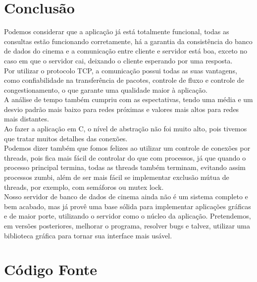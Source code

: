 \documentclass[11pt,twoside]{article}
\begin{document}
\section{Conclusão}
Podemos considerar que a aplicação já está totalmente funcional, todas as consultas estão funcionando corretamente, há a garantia da consistência do banco de dados do cinema e a comunicação entre cliente e servidor está boa, exceto no caso em que o servidor cai, deixando o cliente esperando por uma resposta.\\
Por utilizar o protocolo TCP, a comunicação possui todas as suas vantagens, como confiabilidade na transferência de pacotes, controle de fluxo e controle de congestionamento, o que garante uma qualidade maior à aplicação.\\
A análise de tempo também cumpriu com as espectativas, tendo uma média e um desvio padrão mais baixo para redes próximas e valores mais altos para redes mais distantes.\\
Ao fazer a aplicação em C, o nível de abstração não foi muito alto, pois tivemos que tratar muitos detalhes das conexões.\\
Podemos dizer também que fomos felizes ao utilizar um controle de conexões por threads, pois fica mais fácil de controlar do que com processos, já que quando o processo principal termina, todas as threads também terminam, evitando assim processos zumbi, além de ser mais fácil se implementar exclusão mútua de threads, por exemplo, com semáforos ou mutex lock.\\
Nosso servidor de banco de dados de cinema ainda não é um sistema completo e bem acabado, mas já provê uma base sólida para implementar aplicações gráficas e de maior porte, utilizando o servidor como o núcleo da aplicação. Pretendemos, em versões posteriores, melhorar o programa, resolver bugs e talvez, utilizar uma biblioteca gráfica para tornar sua interface mais usável. 

\section{Código Fonte}
\end{document}
